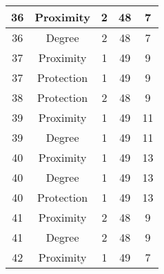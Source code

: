 \documentclass[results.tex]{subfiles}
\begin{document}
\begin{center}
\begin{tabular}{| c || c | c | c | c |}
            \hline
            36                      & Proximity                    & 2                      & 48                      & 7                    \\
            \hline
            36                      & Degree                       & 2                      & 48                      & 7                    \\
            \hline
            37                      & Proximity                    & 1                      & 49                      & 9                    \\
            \hline
            37                      & Protection                   & 1                      & 49                      & 9                    \\
            \hline
            38                      & Protection                   & 2                      & 48                      & 9                    \\
            \hline
            39                      & Proximity                    & 1                      & 49                      & 11                   \\
            \hline
            39                      & Degree                       & 1                      & 49                      & 11                   \\
            \hline
            40                      & Proximity                    & 1                      & 49                      & 13                   \\
            \hline
            40                      & Degree                       & 1                      & 49                      & 13                   \\
            \hline
            40                      & Protection                   & 1                      & 49                      & 13                   \\
            \hline
            41                      & Proximity                    & 2                      & 48                      & 9                    \\
            \hline
            41                      & Degree                       & 2                      & 48                      & 9                    \\
            \hline
            42                      & Proximity                    & 1                      & 49                      & 7                    \\

\end{tabular}
\end{center}
\end{document}
